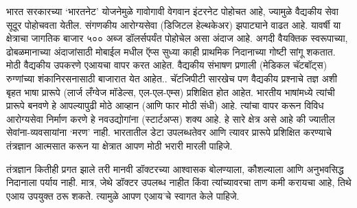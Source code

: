भारत सरकारच्या `भारतनेट' योजनेमुळे गावोगावी वेगवान इंटरनेट पोहोचत आहे, ज्यामुळे वैद्यकीय सेवा सूदूर पोहोचवता येतील. संगणकीय आरोग्यसेवा (डिजिटल हेल्थकेअर) झपाट्याने वाढत आहे. यावर्षी या क्षेत्राचा जागतिक बाजार ५०० अब्ज डॉलर्सपर्यंत पोहोचेल असा अंदाज आहे. अगदी वैयक्तिक स्वरूपाच्या, ढोबळमानाच्या अंदाजांसाठी मोबाईल मधील ऍप्स सुध्या काही प्राथमिक निदानाच्या गोष्टी सांगू शकतात. मोठी वैद्यकीय उपकरणे एआयचा वापर करत आहेत. वैद्यकीय संभाषण प्रणाली (मेडिकल चॅटबॉट्स) रुग्णांच्या शंकानिरसनासाठी बाजारात येत आहेत.. चॅटजिपीटी सारखेच पण वैद्यकीय प्रश्नाचे तज्ञ अशी बृहत भाषा प्रारूपे (लार्ज लँग्वेज मॉडेल्स, एल-एल-एम्स) प्रशिक्षित होत आहेत. भारतीय भाषांमध्ये त्यांची प्रारूपे बनवणे हे आपल्यापुढी मोठे आव्हान (आणि फार मोठी संधी) आहे. त्यांचा वापर करून विविध आरोग्यसेवा निर्माण करणे हे नवउद्योगांना (स्टार्टअप्स) शक्य आहे. हे सारे क्षेत्र असे आहे की ज्यातील सेवांना-व्यवसायांना `मरण' नाही. भारतातील डेटा उपलब्धतेवर आणि त्यावर प्रारूपे प्रशिक्षित करण्याचे तंत्रज्ञान आत्मसात करून या क्षेत्रात आपण मोठी भरारी मारली पाहिजे. 

तंत्रज्ञान कितीही प्रगत झाले तरी मानवी डॉक्टरच्या आश्वासक बोलण्याला, कौशल्याला आणि अनुभवसिद्ध निदानाला पर्याय नाही. मात्र, जेथे डॉक्टर उपलब्ध नाहीत किंवा त्यांच्यावरचा ताण कमी करायचा आहे, तिथे एआय उपयुक्त ठरू शकते. त्यामुळे आपण एआय'चे स्वागत केले पाहिजे.